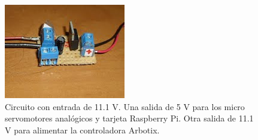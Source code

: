 \begin{figure}[hbtp]
\centering
\includegraphics[scale=0.5]{imagenes/circuito.jpg}
\caption{Circuito con entrada de 11.1 V. Una salida de 5 V para los micro servomotores anal\'ogicos y tarjeta Raspberry Pi. Otra salida de 11.1 V para alimentar la controladora Arbotix.}
\label{fig:circuito}
\end{figure}

